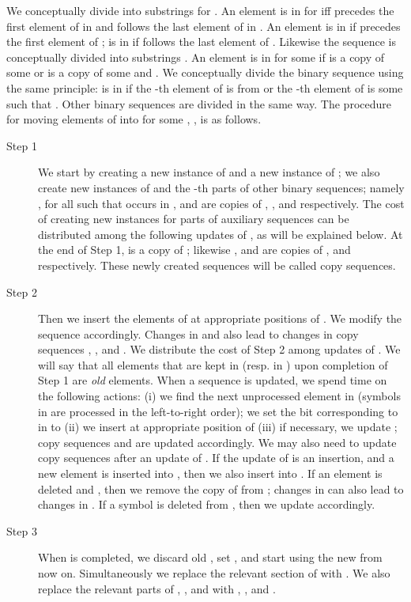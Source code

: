 \documentclass[11pt]{article}\usepackage{fullpage}
\begin{document}
We conceptually divide  into  substrings  for . An element  is in  for  iff  precedes the first element of  in   and follows the last element of  in . An element  is in  if  precedes the first element of ;  is in  if  follows the last element of . 
Likewise the sequence  is conceptually divided into  substrings .
An element  is in  for some  if  is a copy of some  or  is a copy of some  and . 
We conceptually divide the binary sequence   using the same principle:  
 is in  if the -th element of  is from  or the -th element of  is some  such that  . Other binary sequences are divided in the same way.  The procedure for moving elements of  into  for some , , is as follows.
\begin{description}
\item[Step 1]
We start by creating a new instance  of  and a new instance  of ; we also create new instances of 
 and the -th parts of other binary sequences; namely ,  for all  such that  occurs in ,  and  are copies of , ,  and  respectively. The cost of creating new instances for parts of auxiliary sequences can be distributed 
among the following updates of , as will be explained below. At the end of Step 1,  is a copy of ; likewise  ,  and  are copies of  ,  and  respectively. These newly created sequences will be called copy sequences.\\
\item[Step 2]
Then we insert the elements of  at appropriate positions of .  
We  modify the sequence   accordingly. 
Changes in  and  also lead to changes in copy sequences ,  ,  and . We distribute the cost of Step 2 among  updates of .  We will say that all  elements that are kept in  (resp. in ) upon completion of Step 1  are \emph{old} elements.
 When a sequence  is updated, we spend  time on the following actions: (i) we find the next unprocessed element  in  (symbols in  are processed in the left-to-right order);  we set the bit corresponding to  in  to  (ii) we insert  at appropriate position of     (iii) if necessary, we update ; copy sequences  and  are updated accordingly.
We may also need to  update copy sequences after an update of . 
If the update of  is an insertion, and a new element  is inserted into , then we also insert  into . If an element  is deleted and , then we remove the copy of  from ; changes in  can also lead to changes in .  If a symbol  is deleted from , then we update   accordingly. 
\item[Step 3]
When  is completed, we discard old , set , and start using the new  from now on. Simultaneously we replace the relevant section of 
 with . We also replace the relevant parts of ,  ,   and  with , ,   and .
\end{description}
\end{document}
